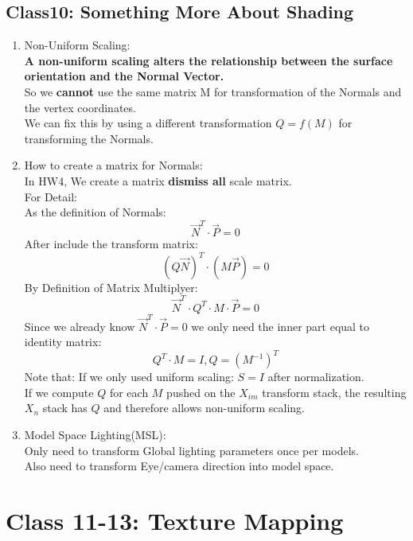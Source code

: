 \documentclass[geye,cyan,normal,en]{elegantnote}
\begin{document}
\subsection{Class10: Something More About Shading}
\begin{enumerate}
	\item Non-Uniform Scaling: \\
	\textbf{A non-uniform scaling alters the relationship between the surface orientation and the Normal Vector.}\\
	So we \textbf{cannot} use the same matrix M for transformation of the Normals and the vertex coordinates.\\
	We can fix this by using a different transformation $Q=f(M)$ for transforming the Normals.
	\item How to create a matrix for Normals:\\
	In HW4, We create a matrix \textbf{dismiss all} scale matrix.\\
	For Detail:\\
	As the definition of Normals: 
	$$\vec{N}^T\cdot\vec{P}=0$$
	After include the transform matrix: 
	$$(Q\vec{N})^T\cdot(M\vec{P})=0$$
	By Definition of Matrix Multiplyer:
	$$\vec{N}^T \cdot Q^T \cdot M \cdot \vec{P}=0$$
	Since we already know $\vec{N}^T\cdot\vec{P}=0$ we only need the inner part equal to identity matrix:
	$$Q^T \cdot M= I,Q=(M^{-1})^T$$
	Note that: If we only used uniform scaling: $S=I$ after normalization.\\
	If we compute $Q$ for each $M$ pushed on the $X_{im}$ transform stack, the resulting $X_n$ stack has $Q$ and therefore allows non-uniform scaling.	
	\item Model Space Lighting(MSL): \\
	Only need to transform Global lighting parameters once per models.\\
	Also need to transform Eye/camera direction into model space.
\end{enumerate}
\newpage

\section{Class 11-13: Texture Mapping}
\end{document}
